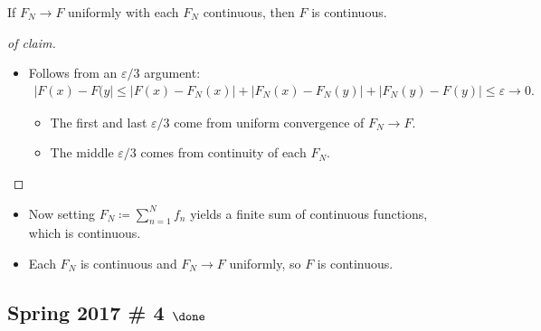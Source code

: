 \begin{solution}

\envlist

\begin{claim}

If \(F_N\to F\) uniformly with each \(F_N\) continuous, then \(F\) is
continuous.

\end{claim}

\begin{proof}[of claim]

\envlist

\begin{itemize}
\item
  Follows from an \(\varepsilon/3\) argument:
  \begin{align*}  
  {\left\lvert {F(x) - F(y} \right\rvert} \leq 
  {\left\lvert {F(x) - F_N(x)} \right\rvert} + {\left\lvert {F_N(x) - F_N(y)} \right\rvert} + {\left\lvert {F_N(y) - F(y)} \right\rvert} 
  \leq {\varepsilon}\to 0
  .\end{align*}

  \begin{itemize}
  \tightlist
  \item
    The first and last \({\varepsilon}/3\) come from uniform convergence
    of \(F_N\to F\).
  \item
    The middle \({\varepsilon}/3\) comes from continuity of each
    \(F_N\).
  \end{itemize}
\end{itemize}

\end{proof}

\begin{itemize}
\tightlist
\item
  Now setting \(F_N\coloneqq\sum_{n=1}^N f_n\) yields a finite sum of
  continuous functions, which is continuous.
\item
  Each \(F_N\) is continuous and \(F_N\to F\) uniformly, so \(F\) is
  continuous.
\end{itemize}

\end{solution}

\hypertarget{spring-2017-4-done}{%
\subsection{\texorpdfstring{Spring 2017 \# 4
\(\done\)}{Spring 2017 \# 4 \textbackslash done}}\label{spring-2017-4-done}}

